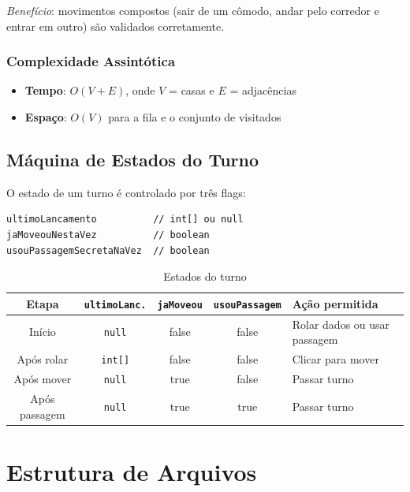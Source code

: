 \documentclass[12pt,a4paper]{report}
\begin{document}
\textit{Benefício}: movimentos compostos (sair de um cômodo, andar pelo corredor e entrar em outro) são validados corretamente.

\subsection{Complexidade Assintótica}

\begin{itemize}
    \item \textbf{Tempo}: $O(V + E)$, onde $V$ = casas e $E$ = adjacências
    \item \textbf{Espaço}: $O(V)$ para a fila e o conjunto de visitados
\end{itemize}

\section{Máquina de Estados do Turno}

O estado de um turno é controlado por três flags:

\begin{lstlisting}
ultimoLancamento          // int[] ou null
jaMoveouNestaVez          // boolean
usouPassagemSecretaNaVez  // boolean
\end{lstlisting}

\begin{table}[H]
\centering
\small
\begin{tabular}{|c|c|c|c|p{3.2cm}|}
\hline
\textbf{Etapa} & \texttt{ultimoLanc.} & \texttt{jaMoveou} & \texttt{usouPassagem} & \textbf{Ação permitida} \\
\hline
Início & \texttt{null} & false & false & Rolar dados ou usar passagem \\
\hline
Após rolar & \texttt{int[]} & false & false & Clicar para mover \\
\hline
Após mover & \texttt{null} & true & false & Passar turno \\
\hline
Após passagem & \texttt{null} & true & true & Passar turno \\
\hline
\end{tabular}
\caption{Estados do turno}
\end{table}

\chapter{Estrutura de Arquivos}
\end{document}
